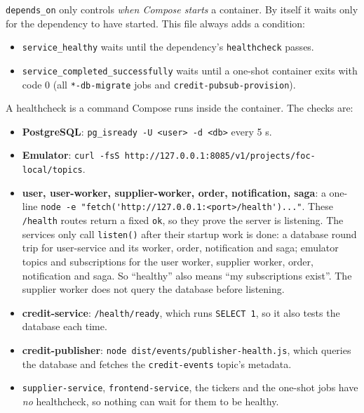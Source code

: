 \documentclass[11pt,a4paper]{article}
\newcommand{\code}[1]{\nolinkurl{#1}}
\begin{document}
\code{depends_on} only controls \emph{when Compose starts} a container. By itself it
waits only for the dependency to have started. This file always adds a condition:
\begin{itemize}
  \item \code{service_healthy} waits until the dependency's \code{healthcheck} passes.
  \item \code{service_completed_successfully} waits until a one-shot container exits
  with code 0 (all \code{*-db-migrate} jobs and \code{credit-pubsub-provision}).
\end{itemize}
A healthcheck is a command Compose runs inside the container. The checks are:
\begin{itemize}
  \item \textbf{PostgreSQL}: \code{pg_isready -U <user> -d <db>} every 5 s.
  \item \textbf{Emulator}: \code{curl -fsS http://127.0.0.1:8085/v1/projects/foc-local/topics}.
  \item \textbf{user, user-worker, supplier-worker, order, notification, saga}: a
  one-line \code{node -e "fetch('http://127.0.0.1:<port>/health')..."}. These
  \code{/health} routes return a fixed \code{ok}, so they prove the server is
  listening. The services only call \code{listen()} after their startup work is done:
  a database round trip for user-service and its worker, order, notification and saga;
  emulator topics and subscriptions for the user worker, supplier worker, order,
  notification and saga. So
  ``healthy'' also means ``my subscriptions exist''. The supplier worker does not query
  the database before listening.
  \item \textbf{credit-service}: \code{/health/ready}, which runs \code{SELECT 1}, so it
  also tests the database each time.
  \item \textbf{credit-publisher}: \code{node dist/events/publisher-health.js}, which
  queries the database and fetches the \code{credit-events} topic's metadata.
  \item \code{supplier-service}, \code{frontend-service}, the tickers and the one-shot
  jobs have \emph{no} healthcheck, so nothing can wait for them to be healthy.
\end{itemize}
\end{document}
